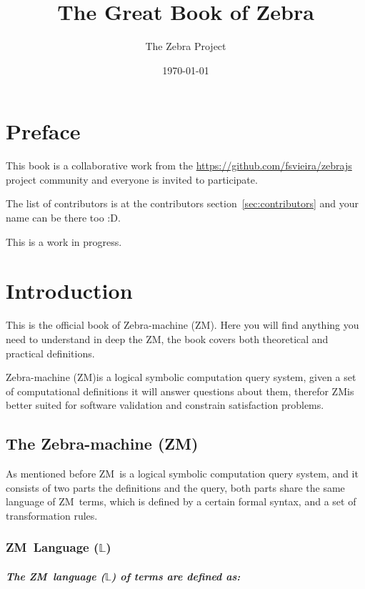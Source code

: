 \documentclass[11pt,a4paper]{report}
\newcommand{\zm}{ZM}
\newcommand{\zsystem}{Zebra-machine (\zm)}
\begin{document}
\title{The Great Book of Zebra}
\author{The Zebra Project}
\date{\today}
\maketitle

\chapter*{Preface}

This book is a collaborative work from the \href{zebrajs}{https://github.com/fsvieira/zebrajs} project community
and everyone is invited to participate.

The list of contributors is at the contributors section~\ref{sec:contributors} and your name can be there too :D.

This is a work in progress.

\tableofcontents

\chapter{Introduction}

This is the official book of \zsystem. Here you will find anything you need to understand in deep the \zm ,
the book covers both theoretical and practical definitions.

\zsystem is a logical symbolic computation query system, given a set of computational definitions it will
answer questions about them, therefor \zm is better suited for software validation and constrain satisfaction problems.

\section{The \zsystem}

As mentioned before \zm\ is a logical symbolic computation query system, and it consists of two parts
the definitions and the query, both parts share the same language of \zm\ terms, which is defined by
a certain formal syntax, and a set of transformation rules.

\subsection{\zm\ Language ($\mathbb{L}$)}
\paragraph{The \zm\ language ($\mathbb{L}$) of terms are defined as:}
\end{document}
